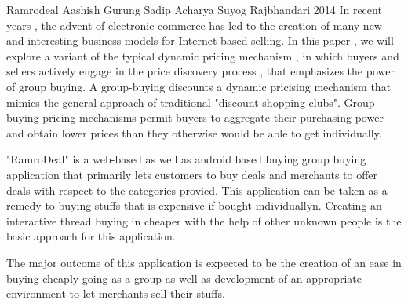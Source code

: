  \begin{conf-abstract}[]
{Ramrodeal}
{
Aashish Gurung
Sadip Acharya
Suyog Rajbhandari
}
{2014}
In recent years , the advent of electronic commerce has led to the creation of 
many new and interesting business models for Internet-based selling. In this
paper , we will explore a variant of the typical dynamic pricing mechanism , in
which buyers and sellers actively engage in the price discovery process , that
emphasizes the power of group buying. A group-buying discounts a dynamic
pricising mechanism that mimics the general approach of traditional "discount
shopping clubs". Group buying pricing mechanisms permit buyers to aggregate
their purchasing power and obtain lower prices than they otherwise would be
able to get individually.

"RamroDeal" is a web-based as well as android based buying group buying 
application that primarily lets customers to buy deals and merchants to offer
deals with respect to the categories provied. This application can be taken as a
remedy to buying stuffs that is expensive if bought individuallyn. Creating an
interactive thread buying in cheaper with the help of other unknown people is
the basic approach for this application.

The major outcome of this application is expected to be the creation of an ease
in buying cheaply going as a group as well as development of an appropriate
environment to let merchants sell their stuffs.
  \end{conf-abstract}